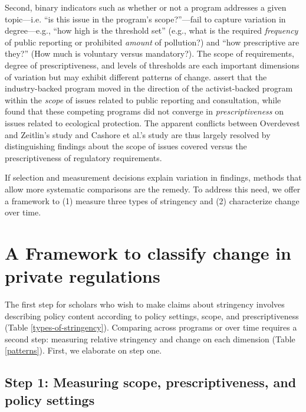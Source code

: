 \documentclass[
      12pt,
            Review ]{article}
\begin{document}
Second, binary indicators such as whether or not a program addresses a given topic---i.e. ``is this issue in the program's scope?''---fail to capture variation in degree---e.g., ``how high is the threshold set'' (e.g., what is the required \emph{frequency} of public reporting or prohibited \emph{amount} of pollution?) and ``how prescriptive are they?'' (How much is voluntary versus mandatory?). The scope of requirements, degree of prescriptiveness, and levels of thresholds are each important dimensions of variation but may exhibit different patterns of change. \citet{Overdevest2014} assert that the industry-backed program moved in the direction of the activist-backed program within the \emph{scope} of issues related to public reporting and consultation, while \citet{Cashore2004} found that these competing programs did not converge in \emph{prescriptiveness} on issues related to ecological protection. The apparent conflicts between Overdevest and Zeitlin's study and Cashore et al.'s study are thus largely resolved by distinguishing findings about the scope of issues covered versus the prescriptiveness of regulatory requirements.

If selection and measurement decisions explain variation in findings, methods that allow more systematic comparisons are the remedy. To address this need, we offer a framework to (1) measure three types of stringency and (2) characterize change over time.

\hypertarget{a-framework-to-classify-change-in-private-regulations}{%
\section{A Framework to classify change in private regulations}\label{a-framework-to-classify-change-in-private-regulations}}

The first step for scholars who wish to make claims about stringency involves describing policy content according to policy settings, scope, and prescriptiveness (Table \ref{types-of-stringency}). Comparing across programs or over time requires a second step: measuring relative stringency and change on each dimension (Table \ref{patterns}). First, we elaborate on step one.

\hypertarget{step-1-measuring-scope-prescriptiveness-and-policy-settings}{%
\subsection{Step 1: Measuring scope, prescriptiveness, and policy settings}\label{step-1-measuring-scope-prescriptiveness-and-policy-settings}}
\end{document}
